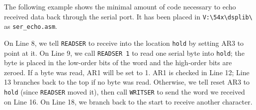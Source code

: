 The following example shows the minimal amount of code necessary to
echo received data back through the serial port. It has been placed in
\verb+V:\54x\dsplib\+ as \verb+ser_echo.asm+.

\setlength{\baselineskip}{0.4cm}
\setlength{\baselineskip}{0.5cm}

On Line 8, we tell \verb+READSER+ to receive into the location \verb+hold+
by setting AR3 to point at it. On Line 9, we call \verb+READSER 1+ to
read one serial byte into \verb+hold+; the byte is placed in the low-order
bits of the word and the high-order bits are zeroed. If a byte was read,
AR1 will be set to 1. AR1 is checked in Line 12; Line 13 branches back to
the top if no byte was read. Otherwise, we tell reset AR3 to \verb+hold+
(since \verb+READSER+ moved it), then call \verb+WRITSER+ to send the
word we received on Line 16. On Line 18, we branch back to the start to
receive another character.
